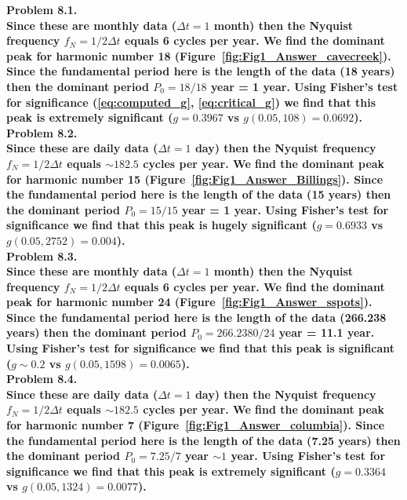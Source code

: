 \noindent
\bf{Problem 8.1.} \\

Since these are monthly data ($\Delta t = 1$ month) then the Nyquist frequency $f_N = 1/2\Delta t$ equals
6 cycles per year.  We find the dominant peak for harmonic number 18 (Figure~\ref{fig:Fig1_Answer_cavecreek}).
Since the fundamental period here
is the length of the data (18 years) then the dominant period $P_0 = 18/18$ year = 1 year. Using Fisher's
test for significance (\ref{eq:computed_g}, \ref{eq:critical_g}) we find that this peak
is extremely significant ($g = 0.3967$ vs $g(0.05,108) = 0.0692$). \\


\noindent
\bf{Problem 8.2.} \\

Since these are daily data ($\Delta t = 1$ day) then the Nyquist frequency $f_N = 1/2\Delta t$ equals
$\sim 182.5$ cycles per year.  We find the dominant peak for harmonic number 15 (Figure~\ref{fig:Fig1_Answer_Billings}).
Since the fundamental period here
is the length of the data (15 years) then the dominant period $P_0 = 15/15$ year = 1 year. Using Fisher's
test for significance we find that this peak is hugely significant ($g = 0.6933$ vs $g(0.05,2752) = 0.004$). \\


\noindent
\bf{Problem 8.3.} \\

Since these are monthly data ($\Delta t = 1$ month) then the Nyquist frequency $f_N = 1/2\Delta t$ equals
6 cycles per year.  We find the dominant peak for harmonic number 24 (Figure~\ref{fig:Fig1_Answer_sspots}).  Since the fundamental period here
is the length of the data (266.238 years) then the dominant period $P_0 = 266.2380/24$ year = 11.1 year. Using Fisher's
test for significance we find that this peak is significant ($g \sim 0.2$ vs $g(0.05,1598) = 0.0065$). \\


\noindent
\bf{Problem 8.4.} \\

Since these are daily data ($\Delta t = 1$ day) then the Nyquist frequency $f_N = 1/2\Delta t$ equals
$\sim 182.5$ cycles per year.  We find the dominant peak for harmonic number 7 (Figure~\ref{fig:Fig1_Answer_columbia}).
Since the fundamental period here
is the length of the data (7.25 years) then the dominant period $P_0 = 7.25/7$ year $\sim 1$ year. Using Fisher's
test for significance we find that this peak is extremely significant ($g = 0.3364$ vs $g(0.05,1324) = 0.0077$). \\


